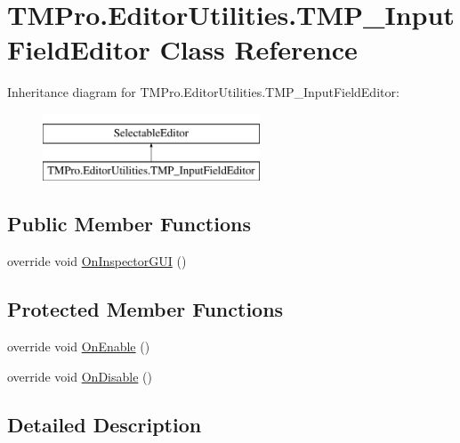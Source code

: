 \hypertarget{class_t_m_pro_1_1_editor_utilities_1_1_t_m_p___input_field_editor}{}\section{T\+M\+Pro.\+Editor\+Utilities.\+T\+M\+P\+\_\+\+Input\+Field\+Editor Class Reference}
\label{class_t_m_pro_1_1_editor_utilities_1_1_t_m_p___input_field_editor}
Inheritance diagram for T\+M\+Pro.\+Editor\+Utilities.\+T\+M\+P\+\_\+\+Input\+Field\+Editor\+:\begin{figure}[H]
\begin{center}
\leavevmode
\includegraphics[height=2.000000cm]{class_t_m_pro_1_1_editor_utilities_1_1_t_m_p___input_field_editor}
\end{center}
\end{figure}
\subsection*{Public Member Functions}
\begin{DoxyCompactItemize}
\item 
override void \mbox{\hyperlink{class_t_m_pro_1_1_editor_utilities_1_1_t_m_p___input_field_editor_a59b111f8284526795f6dcc32a3db65f6}{On\+Inspector\+G\+UI}} ()
\end{DoxyCompactItemize}
\subsection*{Protected Member Functions}
\begin{DoxyCompactItemize}
\item 
override void \mbox{\hyperlink{class_t_m_pro_1_1_editor_utilities_1_1_t_m_p___input_field_editor_a13a786fd7318702adc91f2d3a4e5f240}{On\+Enable}} ()
\item 
override void \mbox{\hyperlink{class_t_m_pro_1_1_editor_utilities_1_1_t_m_p___input_field_editor_a3a6a4623990bf29d8bd5c3016b6b8509}{On\+Disable}} ()
\end{DoxyCompactItemize}


\subsection{Detailed Description}


